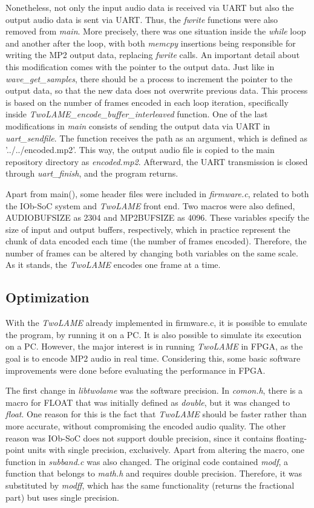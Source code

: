 Nonetheless, not only the input audio data is received via UART but also the output audio data is sent via UART. Thus, the \textit{fwrite} functions were also removed from \textit{main}.
More precisely, there was one situation inside the \textit{while} loop and another after the loop, with both \textit{memcpy} insertions being responsible for writing the MP2 output data, replacing \textit{fwrite} calls. An important detail about this modification comes with the pointer to the output data. Just like in \textit{wave\_get\_samples}, there should be a process to increment the pointer to the output data, so that the new data does not overwrite previous data. This process is based on the number of frames encoded in each loop iteration, specifically inside \textit{\textit{TwoLAME}\_encode\_buffer\_interleaved} function.
One of the last modifications in \textit{main} consists of sending the output data via UART in \textit{uart\_sendfile}. The function receives the path as an argument, which is defined as ’../../encoded.mp2’. This way, the output audio file is copied to the main repository directory as \textit{encoded.mp2}.
Afterward, the UART transmission is closed through \textit{uart\_finish}, and the program returns.

Apart from main(), some header files were included in \textit{firmware.c}, related to both the IOb-SoC system and \textit{TwoLAME} front end. Two macros were also defined, AUDIOBUFSIZE as 2304 and MP2BUFSIZE as 4096. These variables specify the size of input and output buffers, respectively, which in practice represent the chunk of data encoded each time (the number of frames encoded). Therefore, the number of frames can be altered by changing both variables on the same scale. As it stands, the \textit{TwoLAME} encodes one frame at a time.


\subsection{Optimization}

With the \textit{TwoLAME} already implemented in firmware.c, it is possible to emulate the program, by running it on a PC. It is also possible to simulate its execution on a PC. However, the major interest is in running \textit{TwoLAME} in FPGA, as the goal is to encode MP2 audio in real time. Considering this, some basic software improvements were done before evaluating the performance in FPGA.

The first change in \textit{libtwolame} was the software precision. In \textit{comon.h}, there is a macro for FLOAT that was initially defined as \textit{double}, but it was changed to \textit{float}. One reason for this is the fact that \textit{TwoLAME} should be faster rather than more accurate, without compromising the encoded audio quality. The other reason was IOb-SoC does not support double precision, since it contains floating-point units with single precision, exclusively. Apart from altering the macro, one function in \textit{subband.c} was also changed. The original code contained \textit{modf}, a function that belongs to \textit{math.h} and requires double precision. Therefore, it was substituted by \textit{modff}, which has the same functionality (returns the fractional part) but uses single precision.

